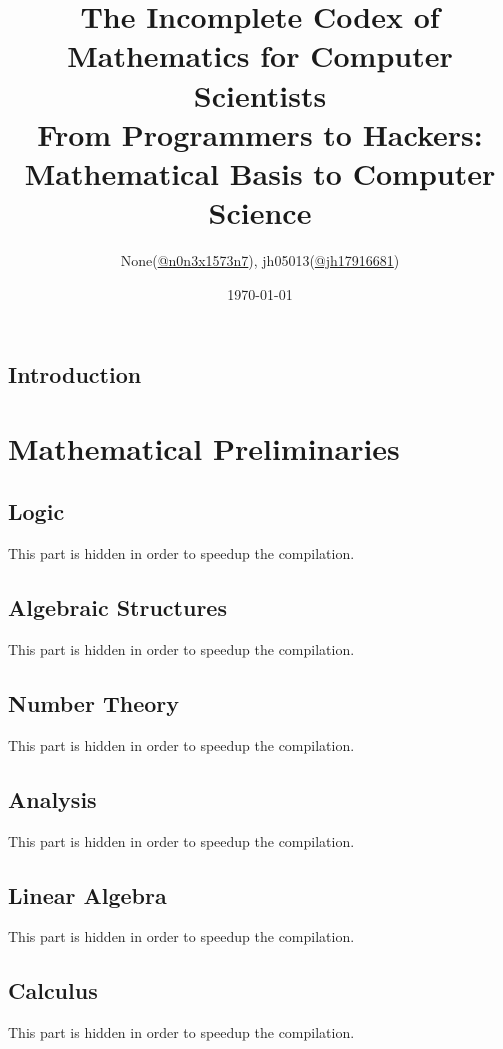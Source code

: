 \documentclass{report}
\title{
	The Incomplete Codex of Mathematics for Computer Scientists\\
	\large From Programmers to Hackers: Mathematical Basis to Computer Science
}
\author{None(\href{https://www.twitter.com/n0n3x1573n7}{@n0n3x1573n7}), jh05013(\href{https://twitter.com/jh17916681}{@jh17916681})}
\date{\today}
\theoremstyle{break}
\begin{document}
	\maketitle

	\chapter{Introduction}
		
	
	\tableofcontents
	
	\part{Mathematical Preliminaries}
	
		\chapter{Logic}
		    This part is hidden in order to speedup the compilation.

		\chapter{Algebraic Structures}
		    This part is hidden in order to speedup the compilation.
	
		\chapter{Number Theory}
		    This part is hidden in order to speedup the compilation.
	
		\chapter{Analysis}
		    This part is hidden in order to speedup the compilation.
		
		\chapter{Linear Algebra}
		    This part is hidden in order to speedup the compilation.
		
		\chapter{Calculus}
		    This part is hidden in order to speedup the compilation.
		
\end{document}
